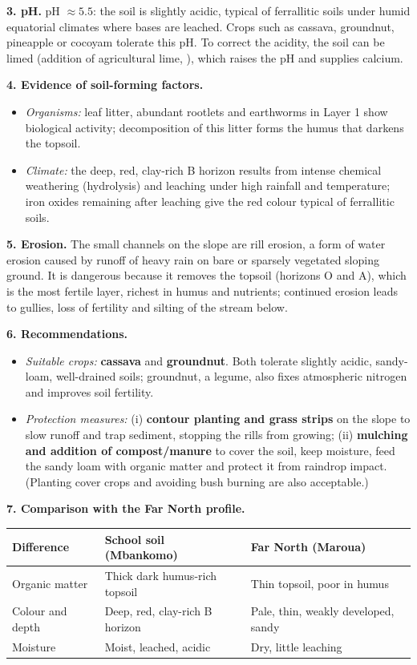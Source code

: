 \documentclass[11pt]{article}
\newcommand{\cle}[1]{{\popxbold\color{popdark}#1}}
\begin{document}
\textbf{3. pH.} pH $\approx 5.5$: the soil is \cle{slightly acidic}, typical of ferrallitic soils under humid equatorial climates where bases are leached. Crops such as cassava, groundnut, pineapple or cocoyam tolerate this pH. To correct the acidity, the soil can be \cle{limed} (addition of agricultural lime, ), which raises the pH and supplies calcium.

\textbf{4. Evidence of soil-forming factors.}
\begin{itemize}
\item \emph{Organisms:} leaf litter, abundant rootlets and earthworms in Layer 1 show biological activity; decomposition of this litter forms the \cle{humus} that darkens the topsoil.
\item \emph{Climate:} the deep, red, clay-rich B horizon results from intense \cle{chemical weathering} (hydrolysis) and \cle{leaching} under high rainfall and temperature; iron oxides remaining after leaching give the red colour typical of \cle{ferrallitic soils}.
\end{itemize}

\textbf{5. Erosion.} The small channels on the slope are \cle{rill erosion}, a form of water erosion caused by runoff of heavy rain on bare or sparsely vegetated sloping ground. It is dangerous because it removes the \cle{topsoil} (horizons O and A), which is the most fertile layer, richest in humus and nutrients; continued erosion leads to gullies, loss of fertility and silting of the stream below.

\textbf{6. Recommendations.}
\begin{itemize}
\item \emph{Suitable crops:} \textbf{cassava} and \textbf{groundnut}. Both tolerate slightly acidic, sandy-loam, well-drained soils; groundnut, a legume, also fixes atmospheric nitrogen and improves soil fertility.
\item \emph{Protection measures:} (i) \textbf{contour planting and grass strips} on the slope to slow runoff and trap sediment, stopping the rills from growing; (ii) \textbf{mulching and addition of compost/manure} to cover the soil, keep moisture, feed the sandy loam with organic matter and protect it from raindrop impact. (Planting cover crops and avoiding bush burning are also acceptable.)
\end{itemize}

\textbf{7. Comparison with the Far North profile.}

\begin{center}
\begin{tabularx}{\linewidth}{|X|X|X|}
\hline
\rowcolor{popblueL} \textbf{Difference} & \textbf{School soil (Mbankomo)} & \textbf{Far North (Maroua)} \\
\hline
Organic matter & Thick dark humus-rich topsoil & Thin topsoil, poor in humus \\
\hline
Colour and depth & Deep, red, clay-rich B horizon & Pale, thin, weakly developed, sandy \\
\hline
Moisture & Moist, leached, acidic & Dry, little leaching \\
\hline
\end{tabularx}
\end{center}
\end{document}
